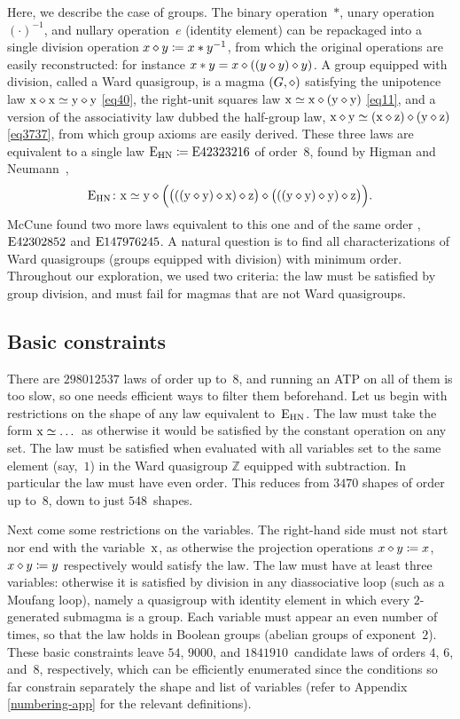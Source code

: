 Here, we describe the case of groups.  The binary operation~$*$, unary operation~$(\cdot )^{-1}$, and nullary operation~$e$ (identity element) can be repackaged into a single division operation $x \diamond y \coloneqq x*y^{-1}$, from which the original operations are easily reconstructed: for instance $x*y=x\diamond((y\diamond y)\diamond y)$.  A group equipped with division, called a Ward quasigroup, is a magma $(G, \diamond)$ satisfying the unipotence law $\mathrm{x} \diamond \mathrm{x} \simeq \mathrm{y} \diamond \mathrm{y}$ \eqref{eq40}, the right-unit squares law $\mathrm{x} \simeq \mathrm{x} \diamond (\mathrm{y} \diamond \mathrm{y})$ \eqref{eq11}, and a version of the associativity law dubbed the half-group law, $\mathrm{x} \diamond \mathrm{y} \simeq (\mathrm{x} \diamond \mathrm{z}) \diamond (\mathrm{y} \diamond \mathrm{z})$ \eqref{eq3737}, from which group axioms are easily derived.
These three laws are equivalent to a single law $\mathrm{E}_{\mathrm{HN}}\coloneqq \mathrm{E}42323216$ of order~$8$, found by Higman and Neumann~\cite{higman-neumann},
\[
\mathrm{E}_{\mathrm{HN}} \colon \mathrm{x} \simeq \mathrm{y} \diamond \Bigl(\bigl(((\mathrm{y} \diamond \mathrm{y}) \diamond \mathrm{x}) \diamond \mathrm{z}\bigr) \diamond \bigl(((\mathrm{y} \diamond \mathrm{y}) \diamond \mathrm{y}) \diamond \mathrm{z}\bigr)\Bigr) .
\]
McCune found two more laws equivalent to this one and of the same order \cite{mccune1993single}, $\mathrm{E}42302852$ and $\mathrm{E}147976245$.  A natural question is to find all characterizations of Ward quasigroups (groups equipped with division) with minimum order.
Throughout our exploration, we used two criteria: the law must be satisfied by group division, and must fail for magmas that are not Ward quasigroups.

\subsection{Basic constraints}

There are $\num{298012537}$ laws of order up to~$8$, and running an ATP on all of them is too slow, so one needs efficient ways to filter them beforehand.  Let us begin with restrictions on the shape of any law equivalent to~$\mathrm{E}_{\mathrm{HN}}$.
The law must take the form $\mathrm{x}\simeq\dots$ as otherwise it would be satisfied by the constant operation on any set.
The law must be satisfied when evaluated with all variables set to the same element (say,~$1$) in the Ward quasigroup $\mathbb{Z}$ equipped with subtraction.  In particular the law must have even order.
This reduces from $\num{3470}$ shapes of order up to~$8$, down to just $548$~shapes.

Next come some restrictions on the variables.
The right-hand side must not start nor end with the variable~$\mathrm{x}$, as otherwise the projection operations $x\diamond y \coloneqq x$, $x\diamond y\coloneqq y$ respectively would satisfy the law.
The law must have at least three variables: otherwise it is satisfied by division in any diassociative loop (such as a Moufang loop), namely a quasigroup with identity element in which every $2$-generated submagma is a group.
Each variable must appear an even number of times, so that the law holds in Boolean groups (abelian groups of exponent~$2$).
These basic constraints leave $54$, $\num{9000}$, and $\num{1841910}$~candidate laws of orders $4$, $6$, and~$8$, respectively, which can be efficiently enumerated since the conditions so far constrain separately the shape and list of variables (refer to Appendix \ref{numbering-app} for the relevant definitions).

